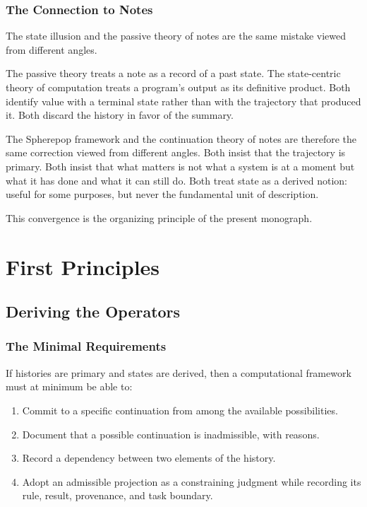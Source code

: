 \documentclass[12pt, a4paper, openany]{book}
\theoremstyle{plain}
\theoremstyle{definition}
\theoremstyle{remark}
\begin{document}
\section{The Connection to Notes}

The state illusion and the passive theory of notes are the same mistake viewed from
different angles.

The passive theory treats a note as a record of a past state. The state-centric
theory of computation treats a program's output as its definitive product. Both
identify value with a terminal state rather than with the trajectory that produced
it. Both discard the history in favor of the summary.

The Spherepop framework and the continuation theory of notes are therefore the
same correction viewed from different angles. Both insist that the trajectory is
primary. Both insist that what matters is not what a system is at a moment but
what it has done and what it can still do. Both treat state as a derived notion:
useful for some purposes, but never the fundamental unit of description.

This convergence is the organizing principle of the present monograph.

\part{First Principles}

\chapter{Deriving the Operators}
\label{ch:collapse-quotient}

\section{The Minimal Requirements}

If histories are primary and states are derived, then a computational framework
must at minimum be able to:

\begin{enumerate}
\item Commit to a specific continuation from among the available possibilities.
\item Document that a possible continuation is inadmissible, with reasons.
\item Record a dependency between two elements of the history.
\item Adopt an admissible projection as a constraining judgment while recording
its rule, result, provenance, and task boundary.
\end{enumerate}
\end{document}

